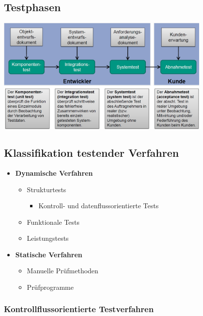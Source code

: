 \documentclass[parskip=full, 12pt]{scrartcl}
\begin{document}
		\subsection{Testphasen}
		
			\begin{center}
				\includegraphics[width=0.8\textwidth]{../images/testphasen.png}
			\end{center}
	
		\subsection{Klassifikation testender Verfahren}
		
			\begin{itemize}
				\item \textbf{Dynamische Verfahren}
				\begin{itemize}
					\item Strukturtests
					\begin{itemize}
						\item Kontroll- und datenflussorientierte Tests
					\end{itemize}
					\item Funktionale Tests
					\item Leistungstests
				\end{itemize}
				\item \textbf{Statische Verfahren}
				\begin{itemize}
					\item Manuelle Prüfmethoden
					\item Prüfprogramme
				\end{itemize}
			\end{itemize}
		
			\newpage
			\subsubsection{Kontrollflussorientierte Testverfahren}
			
\end{document}
